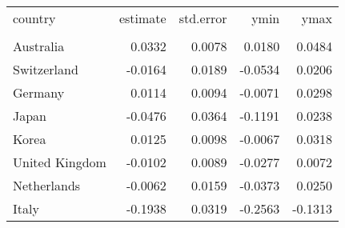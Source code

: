 \begin{tabular}{lrrrr}
   \toprule 
 
country & estimate & std.error & ymin & ymax \\ 

\cmidrule(lr){1-5} 
 
\\[-1.8ex]  
 
Australia & 0.0332 & 0.0078 & 0.0180 & 0.0484 \\ 
  Switzerland & -0.0164 & 0.0189 & -0.0534 & 0.0206 \\ 
  Germany & 0.0114 & 0.0094 & -0.0071 & 0.0298 \\ 
  Japan & -0.0476 & 0.0364 & -0.1191 & 0.0238 \\ 
  Korea & 0.0125 & 0.0098 & -0.0067 & 0.0318 \\ 
  United Kingdom & -0.0102 & 0.0089 & -0.0277 & 0.0072 \\ 
  Netherlands & -0.0062 & 0.0159 & -0.0373 & 0.0250 \\ 
  Italy & -0.1938 & 0.0319 & -0.2563 & -0.1313 \\ 
   \bottomrule  
\end{tabular}
